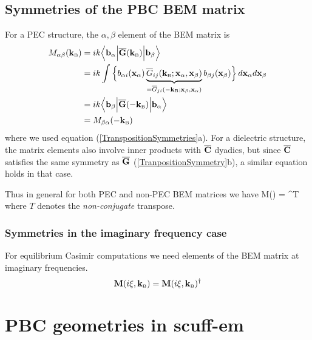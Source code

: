 \subsection{Symmetries of the PBC BEM matrix}

For a PEC structure, the $\alpha,\beta$ element of 
the BEM matrix is 
\begin{align*}
 M_{\alpha\beta}(\mathbf{k}_{\hbox{\tiny{B}}})
&= ik\Big \langle \mathbf{b}_\alpha \Big|
    \overline{\mathbf{G}}(\mathbf{k}_{\hbox{\tiny{B}}})
   \Big| \mathbf{b}_\beta \Big\rangle
\\
&= ik\int 
   \Big\{ 
   b_{\alpha i}(\mathbf{x}_\alpha) 
   \underbrace{\overline{G}_{ij}(\mathbf{k}_{\hbox{\tiny{B}}}; \mathbf{x}_\alpha , \mathbf{x}_\beta)}
             _{=\overline{G}_{ji}(-\mathbf{k}_{\hbox{\tiny{B}}}; \mathbf{x}_\beta , \mathbf{x}_\alpha )}
   b_{\beta j}(\mathbf{x}_\beta) 
   \Big\}\, d\mathbf{x}_\alpha d\mathbf{x}_\beta
\\
&= ik\Big \langle \mathbf{b}_\beta\Big|
    \overline{\mathbf{G}}(-\mathbf{k}_{\hbox{\tiny{B}}})
   \Big| \mathbf{b}_\alpha\Big\rangle
\\
&=M_{\beta\alpha}(-\mathbf{k}_{\hbox{\tiny{B}}})
\end{align*}
where we used equation (\ref{TranspositionSymmetries}a). 
For a dielectric structure, the matrix elements also involve
inner products with $\overline{\mathbf{C}}$ dyadics, but since $\overline{\mathbf{C}}$ satisfies
the same symmetry as $\overline{\mathbf{G}}$ (\ref{TranpositionSymmetry}b), 
a similar equation holds in that case.

Thus in general for both PEC and non-PEC BEM matrices we have
{\vb M(\KB) = \Big[ \vb M(-\KB) \Big]^T}
where $T$ denotes the \textit{non-conjugate} transpose.

\subsubsection*{Symmetries in the imaginary frequency case}

For equilibrium Casimir computations we need elements
of the BEM matrix at imaginary frequencies. 
$$ \mathbf{M}(i\xi, \mathbf{k}_{\hbox{\tiny{B}}}) = \mathbf{M}(i\xi, \mathbf{k}_{\hbox{\tiny{B}}})^\dagger $$

\section{PBC geometries in {\sc scuff-em}}

